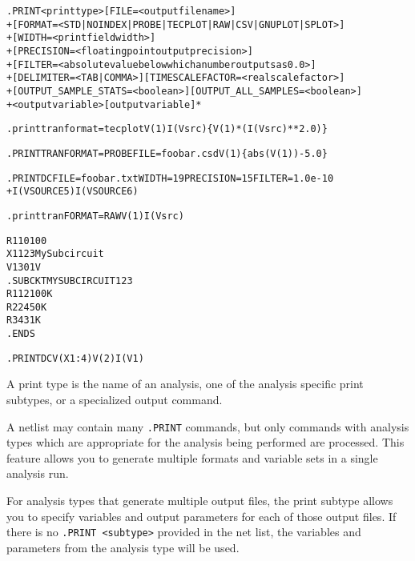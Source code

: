 \begin{Command}

\format
\begin{alltt}
.PRINT <print type> [FILE=<output filename>]
+ [FORMAT=<STD|NOINDEX|PROBE|TECPLOT|RAW|CSV|GNUPLOT|SPLOT>]
+ [WIDTH=<print field width>]
+ [PRECISION=<floating point output precision>]
+ [FILTER=<absolute value below which a number outputs as 0.0>]
+ [DELIMITER=<TAB|COMMA>] [TIMESCALEFACTOR=<real scale factor>]
+ [OUTPUT\_SAMPLE\_STATS=<boolean>] [OUTPUT\_ALL\_SAMPLES=<boolean>]
+ <output variable> [output variable]*
\end{alltt}

\examples
\begin{alltt}
.print tran format=tecplot V(1) I(Vsrc) \{V(1)*(I(Vsrc)**2.0)\}

.PRINT TRAN FORMAT=PROBE FILE=foobar.csd V(1) \{abs(V(1))-5.0\}

.PRINT DC FILE=foobar.txt WIDTH=19 PRECISION=15 FILTER=1.0e-10
+ I(VSOURCE5) I(VSOURCE6)

.print tran FORMAT=RAW V(1) I(Vsrc)

R1 1 0 100
X1 1 2 3 MySubcircuit
V1 3 0 1V
.SUBCKT MYSUBCIRCUIT 1 2 3
R1 1 2  100K
R2 2 4  50K
R3 4 3  1K
.ENDS

.PRINT DC V(X1:4) V(2) I(V1)
\end{alltt}


\arguments

\begin{Arguments}


A print type is the name of an analysis, one of the analysis specific
print subtypes, or a specialized output command.



A netlist may contain many \texttt{.PRINT} commands, but only commands
with analysis types which are appropriate for the analysis being
performed are processed.  This feature allows you to generate multiple
formats and variable sets in a single analysis run.

For analysis types that generate multiple output files, the print
subtype allows you to specify variables and output parameters for each
of those output files.  If there is no \texttt{.PRINT <subtype>} provided in the
net list, the variables and parameters from the analysis type will be
used.



\end{Arguments}
\end{Command}
